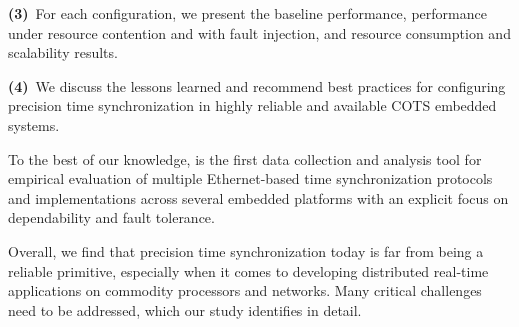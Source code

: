 \textbf{(3)}~For each configuration,
we present the baseline performance, %
performance under resource contention and with fault injection,
and resource consumption and scalability results.

\textbf{(4)}~We discuss the lessons learned and recommend best practices
for configuring precision time synchronization in highly reliable and
available COTS embedded systems.


To the best of our knowledge,
\toolName{} is the first data collection and
analysis tool %
for empirical evaluation of multiple Ethernet-based time
synchronization protocols and implementations across several embedded
platforms with an explicit focus on dependability and fault tolerance.

Overall, we find that precision time synchronization today is far from being
a reliable primitive,
especially when it comes to developing distributed real-time applications on
commodity processors and networks.
Many critical challenges need to be addressed,
which our study identifies in detail.


